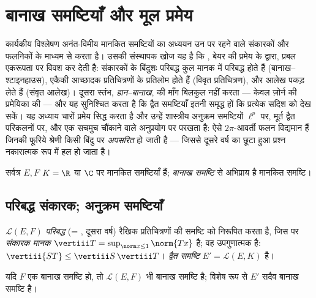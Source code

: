 \chapter{बानाख समष्टियाँ और मूल प्रमेय}
\label{ch:b3:banach}

कार्यकीय विश्लेषण अनंत-विमीय मानकित समष्टियों का अध्ययन उन पर रहने
वाले संकारकों और फलनिकों के माध्यम से करता है। उसकी संस्थापक खोज
यह है कि \emph{}, बेयर की प्रमेय के द्वारा, प्रबल एकरूपता
पर विवश कर देती है: संकारकों के बिंदुशः परिबद्ध कुल मानक में
परिबद्ध होते हैं (बानाख--श्टाइनहाउस),  एकैकी आच्छादक
प्रतिचित्रणों के प्रतिलोम  होते हैं (विवृत प्रतिचित्रण), और
आलेख  पकड़ लेते हैं (संवृत आलेख)। दूसरा स्तंभ,
\emph{हान--बानाख},  की माँग बिलकुल नहीं करता --- केवल
ज़ोर्न की प्रमेयिका की --- और यह सुनिश्चित करता है कि द्वैत
समष्टियाँ इतनी समृद्ध हों कि प्रत्येक सदिश को देख सकें। यह अध्याय
चारों प्रमेय सिद्ध करता है और उन्हें शास्त्रीय अनुक्रम समष्टियों
$\ell^p$ पर, मूर्त द्वैत परिकलनों पर, और एक सचमुच चौंकाने वाले
अनुप्रयोग पर परखता है: ऐसे  $2\pi$-आवर्ती फलन विद्यमान हैं जिनकी
फूरिये श्रेणी किसी बिंदु पर \emph{अपसरित} हो जाती है --- जिससे
दूसरे वर्ष का छूटा हुआ प्रश्न नकारात्मक रूप में हल हो जाता है।

सर्वत्र $E, F$ $K = \R$ या $\C$ पर मानकित समष्टियाँ हैं; \emph{बानाख
समष्टि} से अभिप्राय है  मानकित समष्टि।

\section{परिबद्ध संकारक; अनुक्रम समष्टियाँ}

\begin{definition}\label{def:b3:banach:operator}
$\mathcal L(E, F)$ \emph{परिबद्ध} (= , दूसरा वर्ष) रैखिक प्रतिचित्रणों की
समष्टि को निरूपित करता है, जिस पर \emph{संकारक मानक} $\vertiii T = \sup_{\norm x \leq
1}\norm{Tx}$ है; वह उपगुणात्मक है: $\vertiii{ST} \leq
\vertiii S\,\vertiii T$। \emph{द्वैत
समष्टि} $E' = \mathcal L(E, K)$ है।
\end{definition}

\begin{proposition}\label{prop:b3:banach:llcomplete}
यदि $F$ एक बानाख समष्टि हो, तो $\mathcal L(E, F)$ भी बानाख समष्टि है; विशेष
रूप से $E'$ सदैव बानाख समष्टि है।
\end{proposition}

